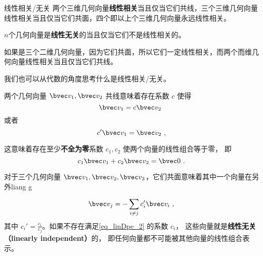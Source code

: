 
\begin{issues}
\issueDraft
\end{issues}


% 

\begin{definition}{线性相关/无关}\label{def_linDpe_1}
两个三维几何向量\textbf{线性相关}当且仅当它们共线，三个三维几何向量线性相关当且仅当它们共面，四个即以上个三维几何向量永远线性相关。

$n$个几何向量是\textbf{线性无关}的当且仅当它们不是线性相关的。
\end{definition}

如果是三个二维几何向量，因为它们共面，所以它们一定线性相关，而两个而维几何向量线性相关当且仅当它们共线。

我们也可以从代数的角度思考什么是线性相关/无关。

两个几何向量 $\bvec v_1, \bvec v_2$ 共线意味着存在系数 $c$ 使得
$$
\bvec v_1 = c \bvec v_2~
$$
或者
$$
c' \bvec v_1 = \bvec v_2~,
$$

这意味着存在至少\textbf{不全为零}系数 $c_1, c_2$ 使两个向量的线性组合等于零， 即
\begin{equation}\label{eq_linDpe_2}
c_1 \bvec v_1 + c_2 \bvec v_2 = \bvec 0~.
\end{equation}

对于三个几何向量 $\bvec v_1, \bvec v_2, \bvec v_3$，它们共面意味着其中一个向量在另外liang g


\begin{equation}\label{eq_linDpe_3}
\bvec v_j = -\sum_{i \ne j} c_i' \bvec v_i~,
\end{equation}
其中 $c_i' = \frac{c_i}{c_j}$。如果不存在满足\autoref{eq_linDpe_2} 的系数 $c_i$， 这些向量就是\textbf{线性无关（linearly independent）}的， 即任何向量都不可能被其他向量的线性组合表示。

